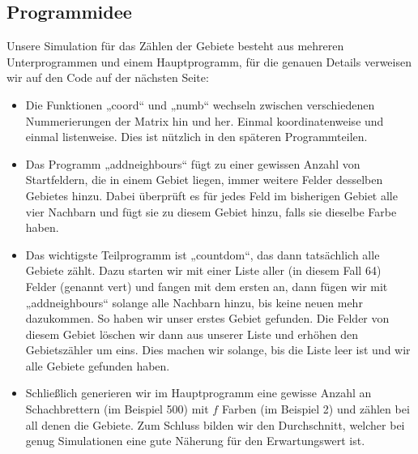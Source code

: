 \documentclass[11pt,a4paper]{article}
\numberwithin{equation}{section}
\numberwithin{table}{section}
\numberwithin{figure}{section}
\begin{document}
\subsection{Programmidee}
Unsere Simulation für das Zählen der Gebiete besteht aus mehreren Unterprogrammen und einem Hauptprogramm, für die genauen Details verweisen wir auf den Code auf der nächsten Seite:
\begin{itemize}
\item  Die Funktionen „coord“ und „numb“ wechseln zwischen verschiedenen Nummerierungen der Matrix hin und her. Einmal koordinatenweise und einmal listenweise. Dies ist nützlich in den späteren Programmteilen.
\item Das Programm „addneighbours“ fügt zu einer gewissen Anzahl von Startfeldern, die in einem Gebiet liegen, immer weitere Felder desselben Gebietes hinzu. Dabei überprüft es für jedes Feld im bisherigen Gebiet alle vier Nachbarn und fügt sie zu diesem Gebiet hinzu, falls sie dieselbe Farbe haben.
\item 
Das wichtigste Teilprogramm ist „countdom“, das dann tatsächlich alle Gebiete zählt. Dazu starten wir mit einer Liste aller (in diesem Fall 64) Felder (genannt vert) und fangen mit dem ersten an, dann fügen wir mit „addneighbours“ solange alle Nachbarn hinzu, bis keine neuen mehr dazukommen. So haben wir unser erstes Gebiet gefunden. Die Felder von diesem Gebiet löschen wir dann aus unserer Liste und erhöhen den Gebietszähler um eins. Dies machen wir solange, bis die Liste leer ist und wir alle Gebiete gefunden haben.
\item 
Schließlich generieren wir im Hauptprogramm eine gewisse Anzahl an Schachbrettern (im Beispiel 500) mit $f$ Farben (im Beispiel 2) und zählen bei all denen die Gebiete. Zum Schluss bilden wir den Durchschnitt, welcher bei genug Simulationen eine gute Näherung für den Erwartungswert ist.
\end{itemize}
\end{document}
